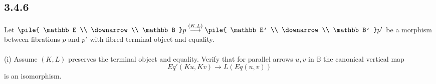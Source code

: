 \documentclass{article}
\newcommand{\vrt}[2]{
\pile{
#1 \\
\downarrow \\
#2
}
}
\begin{document}
 
\subsection*{3.4.6}

Let $\vrt{\mathbb E}{\mathbb B}p \overset{(K,L)}{\longrightarrow} \vrt{\mathbb E'}{\mathbb B'}p'$ be a morphism between
fibrations $p$ and $p'$ with fibred terminal object and equality.\\~\\
(i) Assume $(K,L)$ preserves the terminal object and equality. Verify that for parallel arrows $u,v$ in $\mathbb B$
the canonical vertical map 
$$Eq'(Ku,Kv) \longrightarrow L(Eq(u,v))$$
is an isomorphism.

 
\end{document}
